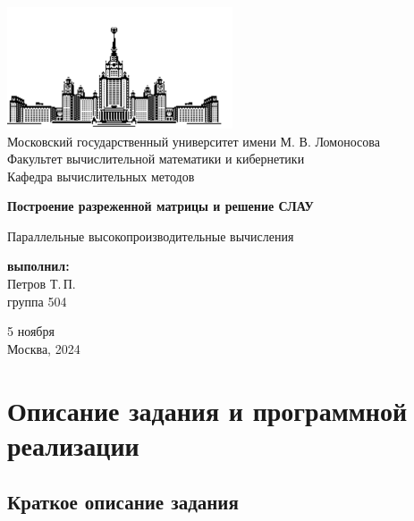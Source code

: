 \documentclass[12pt, a4paper]{article}
\begin{document}
	
\thispagestyle{empty}

\begin{center}
	\ \vspace{-3cm}
	
	\includegraphics[width=0.5\textwidth]{msu-eps-converted-to.pdf}\\
	{Московский государственный университет имени М. В. Ломоносова}\\
	Факультет вычислительной математики и кибернетики\\
	Кафедра вычислительных методов
	
	\vspace{6cm}
	
	{\Large \bfseries Построение разреженной матрицы и решение СЛАУ}
	
	\vspace{1cm}
	
	{\large Параллельные высокопроизводительные вычисления}
\end{center}

\vfill

\begin{flushright}
	\textbf{выполнил:}\\
	Петров Т.\,П. \\
	группа 504
\end{flushright}

\vfill

\begin{center}
	5 ноября \\
	Москва, 2024
\end{center}

\enlargethispage{2\baselineskip}

\newpage

\tableofcontents

\newpage

\section{Описание задания и программной реализации}
\subsection{Краткое описание задания}
\end{document}
